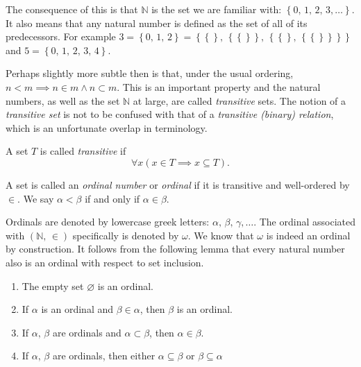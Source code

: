 \documentclass[../../main.tex]{subfiles}
\begin{document}
The consequence of this is that $\mathbb{N}$ is the set we are familiar with: $\left\{0,\, 1,\, 2,\, 3,\ldots\right\}$.
It also means that any natural number is defined as the set of all of its predecessors.
For example $3 = \left\{0,\, 1,\, 2\right\} = \left\{\left\{\right\},\, \left\{\left\{\right\}\right\},\, \left\{\left\{\right\},\, \left\{\left\{\right\}\right\}\right\}\right\}$ and $5 = \left\{0,\, 1,\, 2,\, 3,\, 4\right\}$.

Perhaps slightly more subtle then is that, under the usual ordering, $n < m \implies n \in m \wedge n \subset m$.
This is an important property and the natural numbers, as well as the set $\mathbb{N}$ at large, are called \textit{transitive} sets.
The notion of a \textit{transitive set} is not to be confused with that of a \textit{transitive (binary) relation}, which is an unfortunate overlap in terminology.

\begin{definition}\cite[p.14]{Jec78}
    A set $T$ is called \textit{transitive} if $$\forall x \left(x \in T \implies x \subseteq T\right).$$
\end{definition}

\begin{definition}\cite[p.14]{Jec78}
    A set is called an \textit{ordinal number} or \textit{ordinal} if it is transitive and well-ordered by $\in$.
    We say $\alpha < \beta$ if and only if $\alpha \in \beta$.
\end{definition}

Ordinals are denoted by lowercase greek letters: $\alpha,\, \beta,\, \gamma,\ldots.$
The ordinal associated with $\left(\mathbb{N},\, \in\right)$ specifically is denoted by $\omega$.
We know that $\omega$ is indeed an ordinal by construction.
It follows from the following lemma that every natural number also is an ordinal with respect to set inclusion.

\begin{lemma}\cite[Lemma 2.3, p.15]{Jec78}
    \begin{enumerate}
        \item The empty set $\varnothing$ is an ordinal.
        \item If $\alpha$ is an ordinal and $\beta \in \alpha$, then $\beta$ is an ordinal.
        \item If $\alpha,\, \beta$ are ordinals and $\alpha \subset \beta$, then $\alpha \in \beta$.
        \item If $\alpha,\, \beta$ are ordinals, then either  $\alpha \subseteq \beta$ or $\beta \subseteq \alpha$
    \end{enumerate}
\end{lemma}
\end{document}
